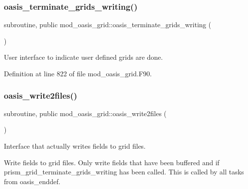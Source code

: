 \subsubsection{\texorpdfstring{oasis\+\_\+terminate\+\_\+grids\+\_\+writing()}{oasis\_terminate\_grids\_writing()}}
{\footnotesize\ttfamily subroutine, public mod\+\_\+oasis\+\_\+grid\+::oasis\+\_\+terminate\+\_\+grids\+\_\+writing (\begin{DoxyParamCaption}{ }\end{DoxyParamCaption})}



User interface to indicate user defined grids are done. 



Definition at line 822 of file mod\+\_\+oasis\+\_\+grid.\+F90.

\mbox{\label{namespacemod__oasis__grid_a275791c512cefae9799e188d92b6f9d4}} 
\subsubsection{\texorpdfstring{oasis\+\_\+write2files()}{oasis\_write2files()}}
{\footnotesize\ttfamily subroutine, public mod\+\_\+oasis\+\_\+grid\+::oasis\+\_\+write2files (\begin{DoxyParamCaption}{ }\end{DoxyParamCaption})}



Interface that actually writes fields to grid files. 

Write fields to grid files. Only write fields that have been buffered and if prism\+\_\+grid\+\_\+terminate\+\_\+grids\+\_\+writing has been called. This is called by all tasks from oasis\+\_\+enddef.


